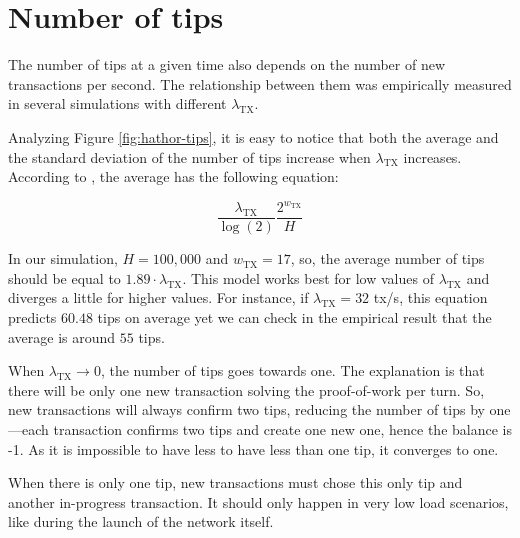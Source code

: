 \section{Number of tips}

The number of tips at a given time also depends on the number of new transactions per second. The relationship between them was empirically measured in several simulations with different $\lambda_\text{TX}$.

Analyzing Figure \ref{fig:hathor-tips}, it is easy to notice that both the average and the standard deviation of the number of tips increase when $\lambda_\text{TX}$ increases. According to \citet{tangle2016}, the average has the following equation:

$$\frac{\lambda_\text{TX}}{\log(2)} \frac{2^{w_\text{TX}}}{H}$$

In our simulation, $H = 100,000$ and $w_\text{TX} = 17$, so, the average number of tips should be equal to $1.89 \cdot \lambda_\text{TX}$. This model works best for low values of $\lambda_\text{TX}$ and diverges a little for higher values. For instance, if $\lambda_\text{TX} = 32$ tx/s, this equation predicts $60.48$ tips on average yet we can check in the empirical result that the average is around $55$ tips.

When $\lambda_\text{TX} \rightarrow 0$, the number of tips goes towards one. The explanation is that there will be only one new transaction solving the proof-of-work per turn. So, new transactions will always confirm two tips, reducing the number of tips by one---each transaction confirms two tips and create one new one, hence the balance is -1. As it is impossible to have less to have less than one tip, it converges to one.

When there is only one tip, new transactions must chose this only tip and another in-progress transaction. It should only happen in very low load scenarios, like during the launch of the network itself.

